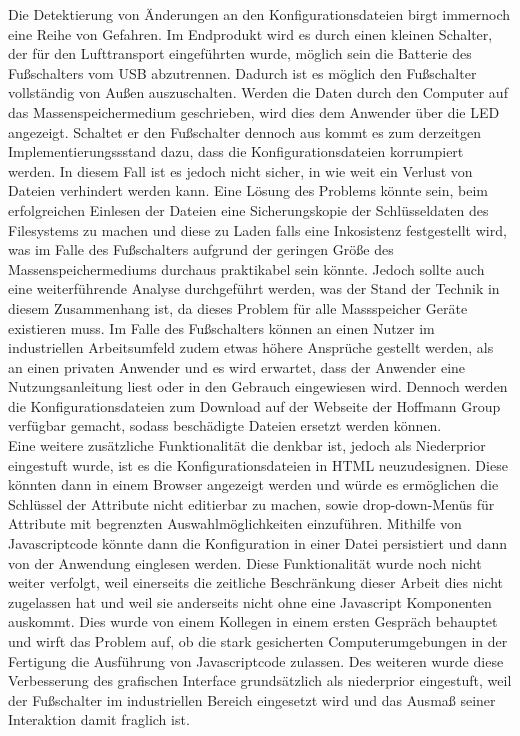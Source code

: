 Die Detektierung von Änderungen an den Konfigurationsdateien birgt immernoch eine Reihe von Gefahren. Im Endprodukt wird es durch einen kleinen Schalter, der für den Lufttransport eingeführten wurde, möglich sein die Batterie des Fußschalters vom USB abzutrennen. Dadurch ist es möglich den Fußschalter vollständig von Außen auszuschalten. Werden die Daten durch den Computer auf das Massenspeichermedium geschrieben, wird dies dem Anwender über die LED angezeigt. Schaltet er den Fußschalter dennoch aus kommt es zum derzeitgen Implementierungssstand dazu, dass die Konfigurationsdateien korrumpiert werden. In diesem Fall ist es jedoch nicht sicher, in wie weit ein Verlust von Dateien verhindert werden kann. Eine Lösung des Problems könnte sein, beim erfolgreichen Einlesen der Dateien eine Sicherungskopie der Schlüsseldaten des Filesystems zu machen und diese zu Laden falls eine Inkosistenz festgestellt wird, was im Falle des Fußschalters aufgrund der geringen Größe des Massenspeichermediums durchaus praktikabel sein könnte. Jedoch sollte auch eine weiterführende Analyse durchgeführt werden, was der Stand der Technik in diesem Zusammenhang ist, da dieses Problem für alle Massspeicher Geräte existieren muss. Im Falle des Fußschalters können an einen Nutzer im industriellen Arbeitsumfeld zudem etwas höhere Ansprüche gestellt werden, als an einen privaten Anwender und es wird erwartet, dass der Anwender eine Nutzungsanleitung liest oder in den Gebrauch eingewiesen wird. Dennoch werden die Konfigurationsdateien zum Download auf der Webseite der Hoffmann Group verfügbar gemacht, sodass beschädigte Dateien ersetzt werden können.\\
Eine weitere zusätzliche Funktionalität die denkbar ist, jedoch als Niederprior eingestuft wurde, ist es die Konfigurationsdateien in \ac{HTML} neuzudesignen. Diese könnten dann in einem Browser angezeigt werden und würde es ermöglichen die Schlüssel der Attribute nicht editierbar zu machen, sowie drop-down-Menüs für Attribute mit begrenzten Auswahlmöglichkeiten einzuführen. Mithilfe von Javascriptcode könnte dann die Konfiguration in einer Datei persistiert und dann von der Anwendung einglesen werden. Diese Funktionalität wurde noch nicht weiter verfolgt, weil einerseits die zeitliche Beschränkung dieser Arbeit dies nicht zugelassen hat und weil sie anderseits nicht ohne eine Javascript Komponenten auskommt. Dies wurde von einem Kollegen in einem ersten Gespräch behauptet und wirft das Problem auf, ob die stark gesicherten Computerumgebungen in der Fertigung die Ausführung von Javascriptcode zulassen. Des weiteren wurde diese Verbesserung des grafischen Interface grundsätzlich als niederprior eingestuft, weil der Fußschalter im industriellen Bereich eingesetzt wird und das Ausmaß seiner Interaktion damit fraglich ist.